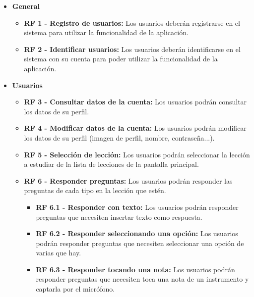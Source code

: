 \begin{itemize}
    \item \textbf{General}
          \begin{itemize}
              \item \textbf{RF 1 - Registro de usuarios: }Los usuarios deberán registrarse en el sistema para utilizar la funcionalidad de la aplicación.
              \item \textbf{RF 2 - Identificar usuarios: }Los usuarios deberán identificarse en el sistema con su cuenta para poder utilizar la funcionalidad de la aplicación.

          \end{itemize}
    \item \textbf{Usuarios}
          \begin{itemize}
              \item \textbf{RF 3 - Consultar datos de la cuenta: }Los usuarios podrán consultar los datos de su perfil.
              \item \textbf{RF 4 - Modificar datos de la cuenta: }Los usuarios podrán modificar los datos de su perfil (imagen de perfil, nombre, contraseña...).
              \item \textbf{RF 5 - Selección de lección: }Los usuarios podrán seleccionar la lección a estudiar de la lista de lecciones de la pantalla principal.
              \item \textbf{RF 6 - Responder preguntas: }Los usuarios podrán responder las preguntas de cada tipo en la lección que estén.
                    \begin{itemize}
                        \item \textbf{RF 6.1 - Responder con texto: }Los usuarios podrán responder preguntas que necesiten insertar texto como respuesta.
                        \item \textbf{RF 6.2 - Responder seleccionando una opción: }Los usuarios podrán responder preguntas que necesiten seleccionar una opción de varias que hay.
                        \item \textbf{RF 6.3 - Responder tocando una nota: }Los usuarios podrán responder preguntas que necesiten toca una nota de un instrumento y captarla por el micrófono.
                    \end{itemize}


\end{itemize}
\end{itemize}

